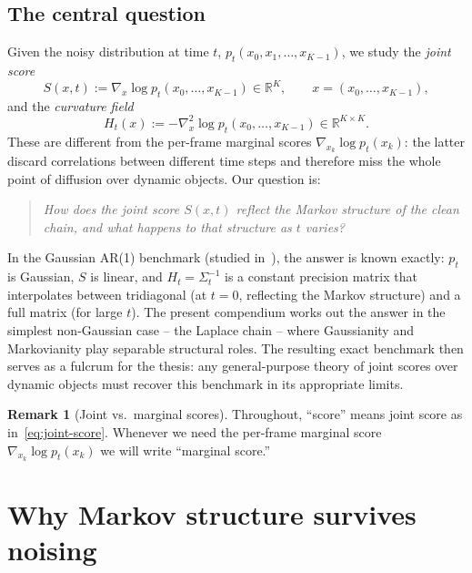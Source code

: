\documentclass[11pt,a4paper,openany]{book}
\theoremstyle{plainserif}
\theoremstyle{definition}
\theoremstyle{remarkstyle}
\newtheorem*{remark}{Remark}
\newcommand{\R}{\mathbb{R}}
\begin{document}
\section{The central question}
\label{sec:central-question}

Given the noisy distribution at time $t$,
$p_t(x_0, x_1, \ldots, x_{K-1})$, we study the \emph{joint score}
\begin{equation}
S(x, t) := \nabla_x \log p_t(x_0, \ldots, x_{K-1}) \in \R^K,
\qquad x = (x_0, \ldots, x_{K-1}),
\label{eq:joint-score}
\end{equation}
and the \emph{curvature field}
\begin{equation}
H_t(x) := -\nabla_x^2 \log p_t(x_0, \ldots, x_{K-1}) \in \R^{K\times K}.
\label{eq:curvature}
\end{equation}
These are different from the per-frame marginal scores
$\nabla_{x_k} \log p_t(x_k)$: the latter discard correlations between
different time steps and therefore miss the whole point of diffusion over
dynamic objects. Our question is:

\begin{quote}
\emph{How does the joint score $S(x, t)$ reflect the Markov structure of
the clean chain, and what happens to that structure as $t$ varies?}
\end{quote}

In the Gaussian AR(1) benchmark (studied in~\cite{structure_sigma_t}), the
answer is known exactly: $p_t$ is Gaussian, $S$ is linear, and
$H_t = \Sigma_t^{-1}$ is a constant precision matrix that interpolates
between tridiagonal (at $t=0$, reflecting the Markov structure) and a
full matrix (for large $t$). The present compendium works out the
answer in the simplest non-Gaussian case -- the Laplace chain -- where
Gaussianity and Markovianity play separable structural roles. The
resulting exact benchmark then serves as a fulcrum for the thesis: any
general-purpose theory of joint scores over dynamic objects must recover
this benchmark in its appropriate limits.

\begin{remark}[Joint vs.\ marginal scores]
Throughout, ``score'' means joint score as in~\eqref{eq:joint-score}.
Whenever we need the per-frame marginal score
$\nabla_{x_k} \log p_t(x_k)$ we will write ``marginal score.''
\end{remark}

\chapter{Why Markov structure survives noising}
\label{ch:markov-survives}
\end{document}
